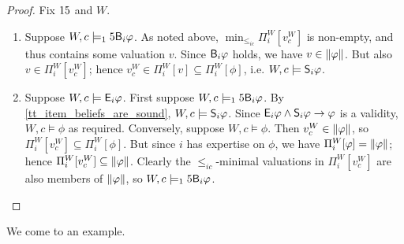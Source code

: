 \begin{proof}
    Fix $\b$ and $W$.
    \begin{enumerate}
        \item Suppose $W, c \models_\b \B_i\phi$. As noted above,
              $\min_{\le_{ic}}{\Pi^W_i[v^W_c]}$ is non-empty, and thus contains
              some valuation $v$. Since $\B_i\phi$ holds, we have $v \in
              \propmods{\phi}$. But also $v \in \Pi^W_i[v^W_c]$; hence $v^W_c
              \in \Pi^W_i[v] \subseteq \Pi^W_i[\phi]$, i.e. $W, c \models
              \S_i\phi$.
        \item Suppose $W, c \models \E_i\phi$. First suppose $W, c \models_\b
            \B_i\phi$. By \cref{tt_item_beliefs_are_sound}, $W, c \models
            \S_i\phi$. Since $\E_i\phi \land \S_i\phi \limplies \phi$ is a
            validity, $W, c \models \phi$ as required.
            Conversely, suppose $W, c \models \phi$. Then $v^W_c \in
            \propmods{\phi}$, so $\Pi^W_i[v^W_c] \subseteq \Pi^W_i[\phi]$. But
            since $i$ has expertise on $\phi$, we have $\Pi^W_i[\phi] =
            \propmods{\phi}$; hence $\Pi^W_i[v^W_c] \subseteq \propmods{\phi}$.
            Clearly the $\le_{ic}$-minimal valuations in $\Pi^W_i[v^W_c]$ are
            also members of $\propmods{\phi}$, so $W, c \models_\b \B_i\phi$.
    \end{enumerate}
\end{proof}

We come to an example.

